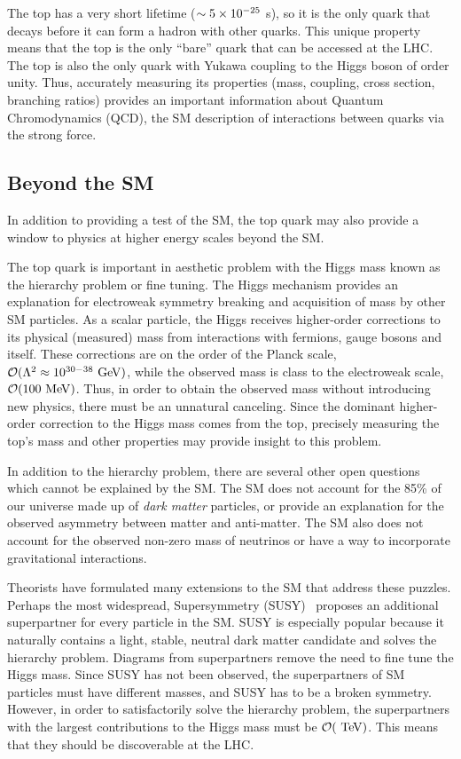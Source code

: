  The top has a very short lifetime ($\sim 5 \times 10^{-25}$ s), so it is the only quark that decays before it can form a hadron with other quarks. This unique property means that the top is the only ``bare'' quark that can be accessed at the LHC. The top is also the only quark with Yukawa coupling to the Higgs boson of order unity. Thus, accurately measuring its properties (mass, coupling, cross section, branching ratios) provides an important information about Quantum Chromodynamics (QCD), the SM description of interactions between quarks via the strong force. 

\subsection{Beyond the SM}
In addition to providing a test of the SM, the top quark may also provide a window to physics at higher energy scales beyond the SM.

The top quark is important in aesthetic problem with the Higgs mass known as the hierarchy problem or fine tuning. The Higgs mechanism provides an explanation for electroweak symmetry breaking and acquisition of mass by other SM particles. As a scalar particle, the Higgs receives higher-order corrections to its physical (measured) mass from interactions with fermions, gauge bosons and itself. These corrections are on the order of the Planck scale, $\mathcal{O}(\Lambda^2 \approx 10^{30-38} \gev)$, while the observed mass is class to the electroweak scale, $\mathcal{O}(100 \mev)$. Thus, in order to obtain the observed mass without introducing new physics, there must be an unnatural canceling. Since the dominant higher-order correction to the Higgs mass comes from the top, precisely measuring the top's mass and other properties may provide insight to this problem. 

In addition to the hierarchy problem, there are several other open questions which cannot be explained by the SM. The SM does not account for the 85\% of our universe made up of \textit{dark matter} particles, or provide an explanation for the observed asymmetry between matter and anti-matter. The SM also does not account for the observed non-zero mass of neutrinos or have a way to incorporate gravitational interactions.

Theorists have formulated many extensions to the SM that address these puzzles. Perhaps the most widespread, Supersymmetry (SUSY)~\cite{susy} proposes an additional superpartner for every particle in the SM. SUSY is especially popular because it naturally contains a light, stable, neutral dark matter candidate and solves the hierarchy problem. Diagrams from superpartners remove the need to fine tune the Higgs mass. Since SUSY has not been observed, the superpartners of SM particles must have different masses, and SUSY has to be a broken symmetry. However, in order to satisfactorily solve the hierarchy problem, the superpartners with the largest contributions to the Higgs mass must be $\mathcal{O}(\tev)$. This means that they should be discoverable at the LHC.

